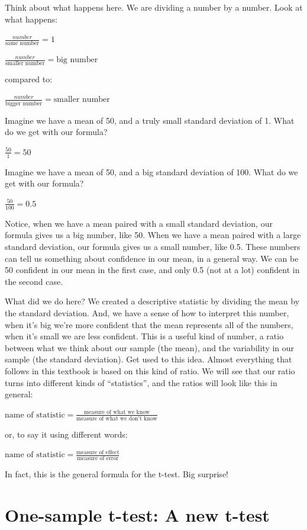 \documentclass[
]{book}
\begin{document}
Think about what happens here. We are dividing a number by a number. Look at what happens:

\(\frac{number}{\text{same number}} = 1\)

\(\frac{number}{\text{smaller number}} = \text{big number}\)

compared to:

\(\frac{number}{\text{bigger number}} = \text{smaller number}\)

Imagine we have a mean of 50, and a truly small standard deviation of 1. What do we get with our formula?

\(\frac{50}{1} = 50\)

Imagine we have a mean of 50, and a big standard deviation of 100. What do we get with our formula?

\(\frac{50}{100} = 0.5\)

Notice, when we have a mean paired with a small standard deviation, our formula gives us a big number, like 50. When we have a mean paired with a large standard deviation, our formula gives us a small number, like 0.5. These numbers can tell us something about confidence in our mean, in a general way. We can be 50 confident in our mean in the first case, and only 0.5 (not at a lot) confident in the second case.

What did we do here? We created a descriptive statistic by dividing the mean by the standard deviation. And, we have a sense of how to interpret this number, when it's big we're more confident that the mean represents all of the numbers, when it's small we are less confident. This is a useful kind of number, a ratio between what we think about our sample (the mean), and the variability in our sample (the standard deviation). Get used to this idea. Almost everything that follows in this textbook is based on this kind of ratio. We will see that our ratio turns into different kinds of ``statistics'', and the ratios will look like this in general:

\(\text{name of statistic} = \frac{\text{measure of what we know}}{\text{measure of what we don't know}}\)

or, to say it using different words:

\(\text{name of statistic} = \frac{\text{measure of effect}}{\text{measure of error}}\)

In fact, this is the general formula for the t-test. Big surprise!

\section{One-sample t-test: A new t-test}\label{one-sample-t-test-a-new-t-test}
\end{document}
